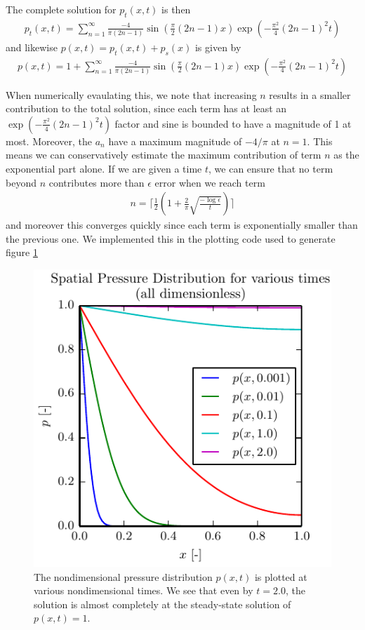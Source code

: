 \documentclass{article}
\begin{document}
The complete solution for $p_t(x,t)$ is then
\begin{align}
    p_t(x,t) = \sum_{n=1}^{\infty} \frac{-4}{\pi (2n - 1)} \sin\left(\frac{\pi}{2} (2n - 1) x\right) \exp\left(-\frac{\pi^2}{4} (2n - 1)^2 t \right)
\end{align}
and likewise $p(x,t) = p_t(x,t) + p_s(x)$ is given by
\begin{align}
    p(x,t) = 1 + \sum_{n=1}^{\infty} \frac{-4}{\pi (2n - 1)} \sin\left(\frac{\pi}{2} (2n - 1) x\right) \exp\left(-\frac{\pi^2}{4} (2n - 1)^2 t \right)
\end{align}

When numerically evaulating this, we note that increasing $n$ results in a smaller contribution to the total solution, since each term has at least an $\exp\left(-\frac{\pi^2}{4} (2n - 1)^2 t \right)$ factor and sine is bounded to have a magnitude of 1 at most.
Moreover, the $a_n$ have a maximum magnitude of $-4/\pi$ at $n=1$.
This means we can conservatively estimate the maximum contribution of term $n$ as the exponential part alone.
If we are given a time $t$, we can ensure that no term beyond $n$ contributes more than $\epsilon$ error when we reach term
\begin{align}
n = \Bigg\lceil \frac{1}{2}\left(1 + \frac{2}{\pi} \sqrt{\frac{-\log{\epsilon}}{t}}\right) \Bigg\rceil
\end{align}
and moreover this converges quickly since each term is exponentially smaller than the previous one.
We implemented this in the plotting code used to generate figure \ref{fig:p_analytic}

\begin{figure}[!ht]
    \centering
    \includegraphics[scale=1.0]{p_over_time.pdf}
    \caption{The nondimensional pressure distribution $p(x,t)$ is plotted at various nondimensional times.
    We see that even by $t=2.0$, the solution is almost completely at the steady-state solution of $p(x,t) = 1$.}
    \label{fig:p_analytic}
\end{figure}

% 
\end{document}

